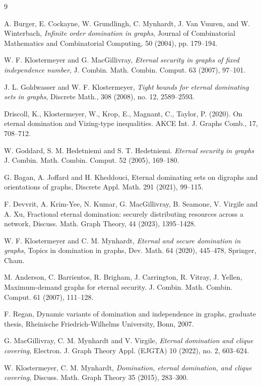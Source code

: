 \documentclass[12pt]{article}
\begin{document}
\begin{thebibliography}{9}	

A. Burger, E. Cockayne, W. Grundlingh, C. Mynhardt, J. Van Vuuren, and
W. Winterbach, \textit{Infinite order domination in graphs}, Journal of Combinatorial Mathematics
and Combinatorial Computing, 50 (2004), pp. 179–194.

W. F. Klostermeyer and G. MacGillivray, \textit{Eternal security in graphs
of fixed independence number}, J. Combin. Math. Combin. Comput. 63 (2007),
97--101.


J. L. Goldwasser and W. F. Klostermeyer, \textit{Tight bounds for eternal
dominating sets in graphs}, Discrete Math., 308 (2008), no. 12, 2589–2593.

Driscoll, K., Klostermeyer, W., Krop, E., Magnant, C., Taylor, P. (2020). On eternal domination and Vizing-type inequalities. AKCE Int. J. Graphs Comb., 17, 708--712.

W. Goddard, S. M. Hedetniemi and S. T. Hedetniemi. \textit{Eternal security in graphs} J.
Combin. Math. Combin. Comput. 52 (2005), 169–180.

G. Bagan, A. Joffard and H. Kheddouci, Eternal dominating sets on
digraphs and orientations of graphs, Discrete Appl. Math. 291 (2021), 99–115.

F. Devvrit, A. Krim-Yee, N. Kumar, G. MacGillivray, B. Seamone,
V. Virgile and A. Xu, Fractional eternal domination: securely distributing
resources across a network, Discuss. Math. Graph Theory, 44 (2023), 1395--1428.

 W. F. Klostermeyer and C. M. Mynhardt, \textit{Eternal and secure domination in graphs}, Topics in domination in graphs, Dev. Math. 64 (2020), 445--478,
Springer, Cham.

M. Anderson, C. Barrientos, R. Brigham, J. Carrington, R. Vitray, J. Yellen, Maximum-demand
graphs for eternal security. J. Combin. Math. Combin. Comput. 61 (2007), 111–128.

F. Regan, Dynamic variants of domination and independence in graphs, graduate thesis,
Rheinische Friedrich-Wilhelms University, Bonn, 2007.

G. MacGillivray, C. M. Mynhardt and V. Virgile, \textit{Eternal domination
and clique covering}, Electron. J. Graph Theory Appl. (EJGTA) 10 (2022), no. 2,
603–624.

W. Klostermeyer, C. M. Mynhardt, \textit{Domination, eternal domination, and clique covering},
Discuss. Math. Graph Theory 35 (2015), 283–300.



\end{thebibliography}
\end{document}
